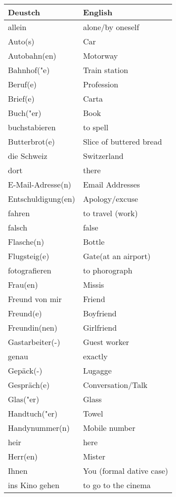 \documentclass{article}
\renewcommand{\arraystretch}{1}
\begin{document}
\begin{minipage}{0.48\textwidth}
    \centering
    \renewcommand{\arraystretch}{1.5}
    \begin{tabular}{|>{\raggedright\arraybackslash}p{3.5cm}|>{\raggedright\arraybackslash}p{3.5cm}|}
        \hline
        \rowcolor{gray!20} \textbf{Deustch} & \textbf{English} \\
        \hline
        allein & alone/by oneself \\\hline
        Auto(s) & Car \\\hline
        Autobahn(en) & Motorway \\\hline
        Bahnhof("e) & Train station \\\hline
        Beruf(e) & Profession \\\hline
        Brief(e) & Carta \\\hline
        Buch("er) & Book \\\hline
        buchstabieren & to spell \\\hline
        Butterbrot(e) & Slice of buttered bread \\\hline
        die Schweiz & Switzerland \\\hline
        dort & there \\\hline
        E-Mail-Adresse(n) & Email Addresses \\\hline
        Entschuldigung(en) & Apology/excuse \\\hline
        fahren & to travel (work) \\\hline
        falsch & false \\\hline
        Flasche(n) & Bottle \\\hline
        Flugsteig(e) & Gate(at an airport) \\\hline
        fotografieren & to phorograph \\\hline
        Frau(en) & Missis \\\hline
        Freund von mir & Friend \\\hline
        Freund(e) & Boyfriend \\\hline
        Freundin(nen) & Girlfriend \\\hline
        Gastarbeiter(-) & Guest worker \\\hline
        genau & exactly \\\hline
        Gepäck(-) & Lugagge \\\hline
        Gespräch(e) & Conversation/Talk \\\hline
        Glas("er) & Glass \\\hline
        Handtuch("er) & Towel \\\hline
        Handynummer(n) & Mobile number \\\hline
        heir & here \\\hline
        Herr(en) & Mister \\\hline
        Ihnen & You (formal dative case) \\\hline
        ins Kino gehen & to go to the cinema \\\hline
    \end{tabular}
\end{minipage}%
\end{document}
